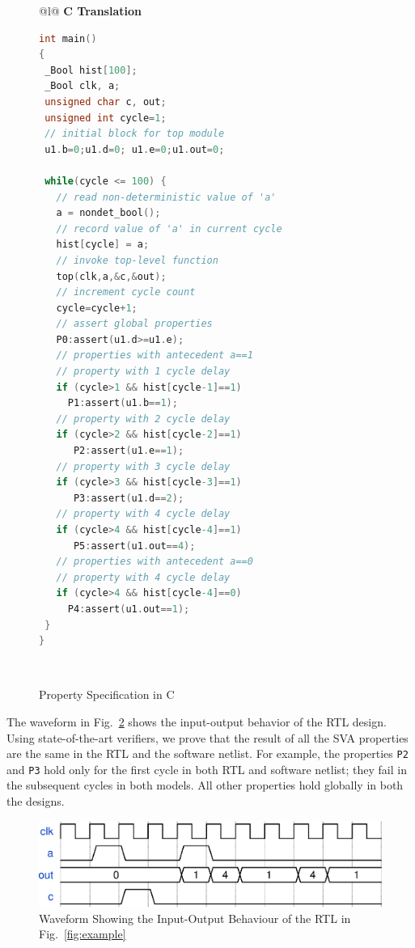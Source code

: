 \begin{figure}[bth]
\small
\begin{center}
\begin{tabular}{@{}l@{}}
\hline\noalign{\vskip0.25ex}
\textbf{C Translation} \\
\hline
\begin{lstlisting}[boxpos=t,mathescape=true,language=C,basicstyle=\scriptsize\ttfamily]
int main() 
{
 _Bool hist[100];
 _Bool clk, a;
 unsigned char c, out;
 unsigned int cycle=1;
 // initial block for top module
 u1.b=0;u1.d=0; u1.e=0;u1.out=0; 
 
 while(cycle <= 100) {
   // read non-deterministic value of 'a'
   a = nondet_bool(); 
   // record value of 'a' in current cycle
   hist[cycle] = a;
   // invoke top-level function
   top(clk,a,&c,&out);
   // increment cycle count
   cycle=cycle+1; 
   // assert global properties 
   P0:assert(u1.d>=u1.e);
   // properties with antecedent a==1 
   // property with 1 cycle delay
   if (cycle>1 && hist[cycle-1]==1) 
     P1:assert(u1.b==1);
   // property with 2 cycle delay
   if (cycle>2 && hist[cycle-2]==1)
      P2:assert(u1.e==1); 
   // property with 3 cycle delay
   if (cycle>3 && hist[cycle-3]==1)
      P3:assert(u1.d==2); 
   // property with 4 cycle delay
   if (cycle>4 && hist[cycle-4]==1)
      P5:assert(u1.out==4); 
   // properties with antecedent a==0
   // property with 4 cycle delay
   if (cycle>4 && hist[cycle-4]==0) 
     P4:assert(u1.out==1);
 }
}
\end{lstlisting}\\
\hline
\end{tabular}
\caption{Property Specification in C}
\label{fig:sva}
\end{center}
\end{figure}

The waveform in Fig.~\ref{intro-waveform} shows the input-output behavior of the RTL design. 
Using state-of-the-art verifiers, we prove that the result of all the SVA properties 
are the same in the RTL and the software netlist. For example, the properties \texttt{P2} and \texttt{P3} 
hold only for the first cycle in both RTL and software netlist; they fail in the 
subsequent cycles in both models.  All other properties 
hold globally in both the designs.
%
\begin{figure} 
\begin{center}
  \includegraphics[width=\columnwidth]{figures/example/waveform1.eps}%
	\caption{Waveform Showing the Input-Output Behaviour of the RTL in Fig.~\ref{fig:example}}
\label{intro-waveform}
\end{center}
\end{figure}
%
